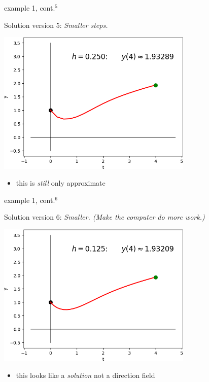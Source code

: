 \documentclass[colorlinks]{beamer}
\begin{document}
\begin{frame}{example 1, cont.$^5$}

Solution version 5: \emph{Smaller steps.}

\bigskip
\hfill \includegraphics[width=0.7\textwidth]{figs/sequence-5}

\begin{itemize}
\item this is \emph{still} only approximate
\end{itemize}
\end{frame}


\begin{frame}{example 1, cont.$^6$}

Solution version 6: \emph{Smaller.  (Make the computer do more work.)}

\bigskip
\hfill \includegraphics[width=0.7\textwidth]{figs/sequence-6}

\begin{itemize}
\item this looks like a \emph{solution} not a direction field 
\end{itemize}
\end{frame}
\end{document}
